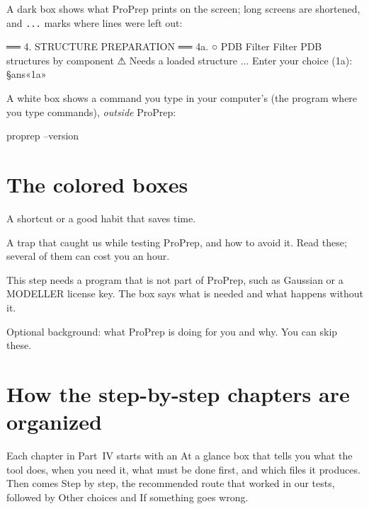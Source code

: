 \medskip
A dark box shows what ProPrep prints on the screen; long screens are shortened,
and \texttt{...} marks where lines were left out:

\begin{screen}
══ 4. STRUCTURE PREPARATION ══
  4a. ○ PDB Filter
        Filter PDB structures by component
        ⚠ Needs a loaded structure
...
Enter your choice (1a): §ans«1a»
\end{screen}

A white box shows a command you type in your computer's 
(the program where you type commands), \emph{outside} ProPrep:

\begin{terminal}
proprep --version
\end{terminal}

\section{The colored boxes}

\begin{tip}
A shortcut or a good habit that saves time.
\end{tip}

\begin{watchout}
A trap that caught us while testing ProPrep, and how to avoid it. Read these;
several of them can cost you an hour.
\end{watchout}

\begin{needsoftware}
This step needs a program that is not part of ProPrep, such as Gaussian or a
MODELLER license key. The box says what is needed and what happens without it.
\end{needsoftware}

\begin{behindscenes}
Optional background: what ProPrep is doing for you and why. You can skip these.
\end{behindscenes}

\section{How the step-by-step chapters are organized}

Each chapter in Part~IV starts with an \textsf{At a glance} box that tells you
what the tool does, when you need it, what must be done first, and which files
it produces. Then comes \textsf{Step by step}, the recommended route that worked
in our tests, followed by \textsf{Other choices} and \textsf{If something goes
wrong}.

